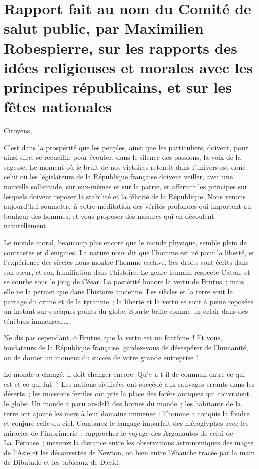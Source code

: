\documentclass[french,twoside]{book} %
\begin{document}
  \chapter[{Rapport fait au nom du Comité de salut public, par Maximilien Robespierre, sur les rapports des idées religieuses et morales avec les principes républicains, et sur les fêtes nationales}]{Rapport fait au nom du Comité de salut public, par Maximilien Robespierre, sur les rapports des idées religieuses et morales avec les principes républicains, et sur les fêtes nationales}
\noindent Citoyens,\par
C’est dans la prospérité que les peuples, ainsi que les particuliers, doivent, pour ainsi dire, se recueillir pour écouter, dans le silence des passions, la voix de la sagesse. Le moment où le bruit de nos victoires retentit dans l’univers est donc celui où les législateurs de la République française doivent veiller, avec une nouvelle sollicitude, sur eux-mêmes et sur la patrie, et affermir les principes sur lesquels doivent reposer la stabilité et la félicité de la République. Nous venons aujourd’hui soumettre à votre méditation des vérités profondes qui importent au bonheur des hommes, et vous proposer des mesures qui en découlent naturellement.\par
Le monde moral, beaucoup plus encore que le monde physique, semble plein de contrastes et d’énigmes. La nature nous dit que l’homme est né pour la liberté, et l’expérience des siècles nous montre l’homme esclave. Ses droits sont écrits dans son cœur, et son humiliation dans l’histoire. Le genre humain respecte Caton, et se courbe sous le joug de César. La postérité honore la vertu de Brutus ; mais elle ne la permet que dans l’histoire ancienne. Les siècles et la terre sont le partage du crime et de la tyrannie ; la liberté et la vertu se sont à peine reposées un instant sur quelques points du globe. Sparte brille comme un éclair dans des ténèbres immenses……\par
Ne dis pas cependant, ô Brutus, que la vertu est un fantôme ! Et vous, fondateurs de la République française, gardez-vous de désespérer de l’humanité, ou de douter un moment du succès de votre grande entreprise !\par
Le monde a changé, il doit changer encore. Qu’y a-t-il de commun entre ce qui est et ce qui fut ? Les nations civilisées ont succédé aux sauvages errants dans les déserts ; les moissons fertiles ont pris la place des forêts antiques qui couvraient le globe. Un monde a paru au-delà des bornes du monde ; les habitants de la terre ont ajouté les mers à leur domaine immense ; l’homme a conquis la foudre et conjuré celle du ciel. Comparez le langage imparfait des hiéroglyphes avec les miracles de l’imprimerie ; rapprochez le voyage des Argonautes de celui de La Pérouse ; mesurez la distance entre les observations astronomiques des mages de l’Asie et les découvertes de Newton, ou bien entre l’ébauche tracée par la main de Dibutade et les tableaux de David.\par
\end{document}
